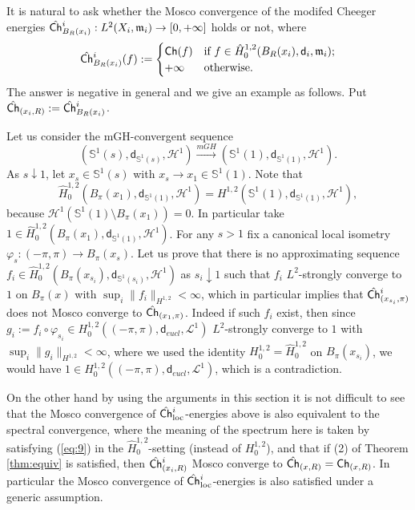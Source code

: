 \documentclass[a4paper,11pt,reqno]{article}
\numberwithin{equation}{section}
\theoremstyle{plain}
\theoremstyle{definition}
\theoremstyle{remark}
\let\altphi\phi
\let\phi\varphi
\let\varphi\altphi
\let\altphi\undefined
\newcommand{\Ch}{{\sf Ch}}
\newcommand{\dist}{\mathsf{d}}
\newcommand{\meas}{\mathfrak{m}}
\begin{document}
{\begin{remark}
It is natural to ask whether the Mosco convergence of the modifed Cheeger energies
$\hat{\Ch}^i_{B_R(x_i)}:L^2(X_i, \meas_i) \to [0, +\infty]$ holds or not, where
\begin{equation}\label{eq:local energy2}
\hat{\Ch}_{B_R(x_i)}^i(f):=
\begin{cases}\Ch(f) &\text{if $f\in \hat{H}^{1, 2}_0(B_R(x_i), \dist_i, \meas_i)$;}\\
+\infty &\text{otherwise.}
\end{cases}
\end{equation}
The answer is negative in general and we give an example as follows. Put $\hat{\Ch}_{(x_i,R)}:=\hat{\Ch}^i_{B_R(x_i)}$.

Let us consider the mGH-convergent sequence 
$$
(\mathbb{S}^1(s), \dist_{\mathbb{S}^1(s)}, \mathcal{H}^1) \stackrel{mGH}{\to} 
(\mathbb{S}^1(1), \dist_{\mathbb{S}^1(1)}, \mathcal{H}^1).
$$
As $s \downarrow 1$, let $x_s \in \mathbb{S}^1(s)$ with $x_s \to x_1 \in \mathbb{S}^1(1)$.
Note that 
$$
\hat{H}^{1, 2}_0(B_{\pi}(x_1), \dist_{\mathbb{S}^1(1)}, \mathcal{H}^1)=
H^{1, 2}(\mathbb{S}^1(1), \dist_{\mathbb{S}^1(1)}, \mathcal{H}^1),
$$
because $\mathcal{H}^1 (\mathbb{S}^1(1) \setminus B_{\pi}(x_1))=0$. In particular take $1 \in \hat{H}^{1, 2}_0(B_{\pi}(x_1), \dist_{\mathbb{S}^1(1)}, \mathcal{H}^1)$.
For any $s>1$ fix a canonical local isometry $\phi_s:(-\pi, \pi) \to B_{\pi}(x_s)$.
Let us prove that there is no approximating sequence $f_i \in \hat{H}^{1, 2}_0(B_{\pi}(x_{s_i}), \dist_{\mathbb{S}^1(s_i)}, \mathcal{H}^1)$ as $s_i \downarrow 1$ such that $f_i$ $L^2$-strongly converge to $1$ on $B_{\pi}(x)$ with $\sup_i\|f_i\|_{H^{1, 2}}<\infty$, which in particular implies that $\hat{\Ch}^i_{(x_{s_i}, \pi)}$ does not Mosco converge to $\hat{\Ch}_{(x_1, \pi)}$.
Indeed if such $f_i$ exist, then since $g_i:= f_i \circ \phi_{s_i} \in H^{1, 2}_0((-\pi, \pi), \dist_{eucl}, \mathcal{L}^1)$ $L^2$-strongly converge to $1$ with $\sup_i\|g_i\|_{H^{1, 2}}<\infty$, where we used the identity $H^{1, 2}_0=\hat{H}_0^{1, 2}$ on $B_{\pi}(x_{s_i})$, we would have $1 \in H^{1, 2}_0((-\pi, \pi), \dist_{eucl}, \mathcal{L}^1)$, which is a contradiction.

On the other hand by using the arguments in this section it is not difficult to see that the Mosco convergence of $\hat{\Ch}^i_{\mathrm{loc}}$-energies above is also equivalent to the spectral convergence, where the meaning of the spectrum here is taken by satisfying (\ref{eq:9}) in the $\hat{H}_0^{1, 2}$-setting (instead of $H^{1,2}_0$), and that if (2) of Theorem \ref{thm:equiv} is satisfied, then $\hat{\Ch}^i_{(x_i, R)}$ Mosco converge to $\hat{\Ch}_{(x, R)}=\Ch_{(x, R)}$.
In particular the Mosco convergence of $\hat{\Ch}^i_{\mathrm{loc}}$-energies is also satisfied under a generic assumption. 
\end{remark}

}
\end{document}
